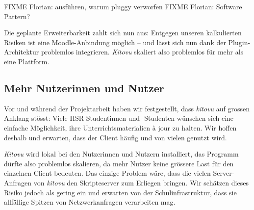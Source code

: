 \documentclass[a4paper]{article}
\begin{document}
FIXME Florian: ausführen, warum pluggy verworfen
FIXME Florian: Software Pattern?

Die geplante Erweiterbarkeit zahlt sich nun aus: Entgegen unseren kalkulierten Risiken ist eine Moodle-Anbindung möglich -- und lässt sich nun dank der Plugin-Architektur problemlos integrieren. \emph{Kitovu} skaliert also problemlos für mehr als eine Plattform.


\subsection{Mehr Nutzerinnen und Nutzer}

Vor und während der Projektarbeit haben wir festgestellt, dass \emph{kitovu} auf grossen Anklang stösst: Viele HSR-Studentinnen und -Studenten wünschen sich eine einfache Möglichkeit, ihre Unterrichtsmaterialien à jour zu halten. Wir hoffen deshalb und erwarten, dass der Client häufig und von vielen genutzt wird.

\emph{Kitovu} wird lokal bei den Nutzerinnen und Nutzern installiert, das Programm dürfte also problemlos skalieren, da mehr Nutzer keine grössere Last für den einzelnen Client bedeuten. Das einzige Problem wäre, dass die vielen Server-Anfragen von \emph{kitovu} den Skripteserver zum Erliegen bringen. Wir schätzen dieses Risiko jedoch als gering ein und erwarten von der Schulinfrastruktur, dass sie allfällige Spitzen von Netzwerkanfragen verarbeiten mag.
\end{document}
